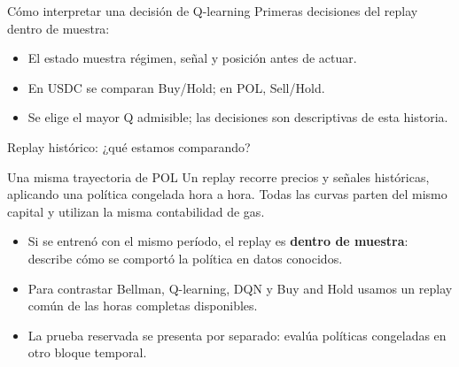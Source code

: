 \documentclass[10pt,aspectratio=169]{beamer}
\begin{document}
\begin{frame}{Cómo interpretar una decisión de Q-learning}
\centering\small Primeras decisiones del replay dentro de muestra:\par\vspace{.6em}
\QTablaAcciones
\vspace{.8em}
\begin{itemize}\small
\item El estado muestra régimen, señal y posición antes de actuar.
\item En USDC se comparan Buy/Hold; en POL, Sell/Hold.
\item Se elige el mayor Q admisible; las decisiones son descriptivas de esta historia.
\end{itemize}
\end{frame}

\begin{frame}{Replay histórico: ¿qué estamos comparando?}
\begin{block}{Una misma trayectoria de POL}
\small Un replay recorre precios y señales históricas, aplicando una política congelada hora a hora. Todas las curvas parten del mismo capital y utilizan la misma contabilidad de gas.
\end{block}
\begin{itemize}
\item Si se entrenó con el mismo período, el replay es \textbf{dentro de muestra}: describe cómo se comportó la política en datos conocidos.
\item Para contrastar Bellman, Q-learning, DQN y Buy and Hold usamos un replay común de las horas completas disponibles.
\item La prueba reservada se presenta por separado: evalúa políticas congeladas en otro bloque temporal.
\end{itemize}
\end{frame}
\end{document}
